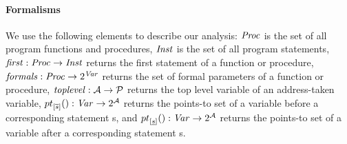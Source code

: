\paragraph{Formalisms}
We use the following elements to describe our analysis:
$\mathit{Proc}$ is the set of all program functions and procedures,
$\mathit{Inst}$ is the set of all program statements,
$\mathit{first}{}: \mathit{Proc} \rightarrow \mathit{Inst}$ returns the first
statement of a function or procedure,
$\mathit{formals}{}: \mathit{Proc} \rightarrow 2^{\mathit{Var}}$ returns the
set of formal parameters of a function or procedure, 
$\mathit{toplevel}{}: \mathcal{A} \rightarrow \mathcal{P}$ returns the top level
variable of an address-taken variable,
${pt}_{[\overline{s}] }(): \mathit{Var} \rightarrow 2^{\mathcal{A}}$ returns the
points-to set of a variable before a corresponding statement s,
and ${pt}_{[\underline{s}]}(): \mathit{Var} \rightarrow 2^{\mathcal{A}}$ returns the
points-to set of a variable after a corresponding statement s.
